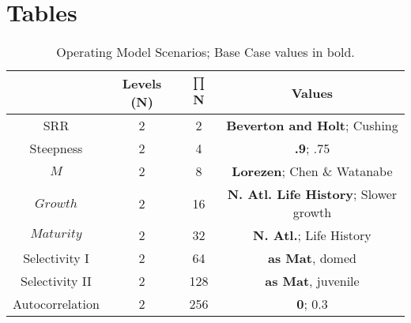 \documentclass[%
nonumbib,      %
%
]{nrc1}                          %
\begin{document}
\section*{Tables}
\clearpage
\begin{table}
\begin{center}
\label{tab:datasumm}
\begin{tabular}{|cccc|}
\hline
			& {\tiny Levels (N)} & {\tiny $\prod$ N} & {\tiny Values} \\ %
\hline\hline
{\tiny SRR} 		& {\tiny 2} 	 & {\tiny   2}  & {\tiny  \textbf{Beverton and Holt}; Cushing}     \\%
{\tiny Steepness}	& {\tiny 2} 	 & {\tiny   4}  & {\tiny  \textbf{.9}; .75}                        \\%
{\tiny $M$} 		& {\tiny 2} 	 & {\tiny   8}  & {\tiny  \textbf{Lorezen}; Chen \& Watanabe} 	   \\%
{\tiny $Growth$} 	& {\tiny 2} 	 & {\tiny  16}  & {\tiny  \textbf{N. Atl. Life History}; Slower growth}\\%
{\tiny $Maturity$} 	& {\tiny 2} 	 & {\tiny  32}  & {\tiny  \textbf{N. Atl.}; Life History}      \\%
{\tiny Selectivity I}	& {\tiny 2} 	 & {\tiny  64}  & {\tiny  \textbf{as Mat}, domed}      		   \\%
{\tiny Selectivity II}	& {\tiny 2} 	 & {\tiny 128}  & {\tiny  \textbf{as Mat}, juvenile}   		   \\%
{\tiny Autocorrelation}	& {\tiny 2} 	 & {\tiny 256}  & {\tiny  \textbf{0}; 0.3}                        \\%
\hline
\end{tabular}
\end{center}
\label{tab:grid}
\caption{Operating Model Scenarios; Base Case values in bold.}  
\end{table}
\end{document}
